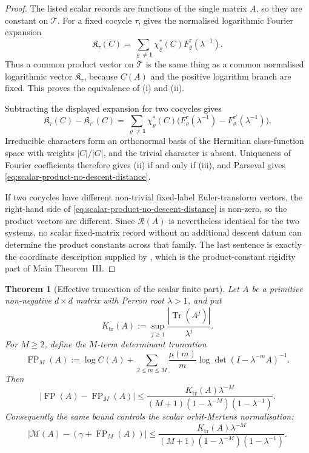 \documentclass[11pt,a4paper]{amsart}
\theoremstyle{plain}
\newtheorem{theorem}{Theorem}[section]
\theoremstyle{definition}
\theoremstyle{remark}
\DeclareMathOperator{\Tr}{Tr}
\DeclareMathOperator{\FP}{FP}
\begin{document}
\begin{proof}
  The listed scalar records are functions of the single matrix \(A\), so they
  are constant on \(\mathscr T\).  For a fixed cocycle \(\tau\),
   gives the normalised logarithmic
  Fourier expansion
  \[
    \mathfrak K_\tau(C)
    =
    \sum_{\varrho\neq\mathbf1}
      \chi_\varrho^\ast(C)F_\varrho^\tau(\lambda^{-1}).
  \]
  Thus a common product vector on \(\mathscr T\) is the same thing as a
  common normalised logarithmic vector \(\mathfrak K_\tau\), because
  \(C(A)\) and the positive logarithm branch are fixed.  This proves the
  equivalence of \textup{(i)} and \textup{(ii)}.

  Subtracting the displayed expansion for two cocycles gives
  \[
    \mathfrak K_\tau(C)-\mathfrak K_{\tau'}(C)
    =
    \sum_{\varrho\neq\mathbf1}
      \chi_\varrho^\ast(C)
      \bigl(F_\varrho^\tau(\lambda^{-1})
            -F_\varrho^{\tau'}(\lambda^{-1})\bigr).
  \]
  Irreducible characters form an orthonormal basis of the Hermitian
  class-function space with weights \(|C|/|G|\), and the trivial character is
  absent.  Uniqueness of Fourier coefficients therefore gives
  \textup{(ii)} if and only if \textup{(iii)}, and Parseval gives
  \eqref{eq:scalar-product-no-descent-distance}.

  If two cocycles have different non-trivial fixed-label Euler-transform
  vectors, the right-hand side of
  \eqref{eq:scalar-product-no-descent-distance} is non-zero, so the product
  vectors are different.  Since \(\mathcal R(A)\) is nevertheless identical
  for the two systems, no scalar fixed-matrix record without an additional
  descent datum can determine the product constants across that family.  The
  last sentence is exactly the coordinate description supplied by
  , which is the product-constant
  rigidity part of Main Theorem~III.
\end{proof}

\begin{theorem}[Effective truncation of the scalar finite part]
  \label{thm:logM-truncation-bound}
  Let \(A\) be a primitive non-negative \(d\times d\) matrix with
  Perron root \(\lambda>1\), and put
  \[
    K_{\mathrm{tr}}(A):=
    \sup_{j\ge1}\frac{|\Tr(A^j)|}{\lambda^j}.
  \]
  For \(M\ge2\), define the \(M\)-term determinant truncation
  \[
    \FP_M(A):=
    \log C(A)+\sum_{2\le m\le M}\frac{\mu(m)}{m}
      \log\det(I-\lambda^{-m}A)^{-1}.
  \]
  Then
  \[
    |\FP(A)-\FP_M(A)|
    \le
    \frac{K_{\mathrm{tr}}(A)\lambda^{-M}}
      {(M+1)(1-\lambda^{-M})(1-\lambda^{-1})}.
  \]
  Consequently the same bound controls the scalar orbit-Mertens
  normalisation:
  \[
    |\mathcal M(A)-(\gamma+\FP_M(A))|
    \le
    \frac{K_{\mathrm{tr}}(A)\lambda^{-M}}
      {(M+1)(1-\lambda^{-M})(1-\lambda^{-1})}.
  \]
\end{theorem}
\end{document}
